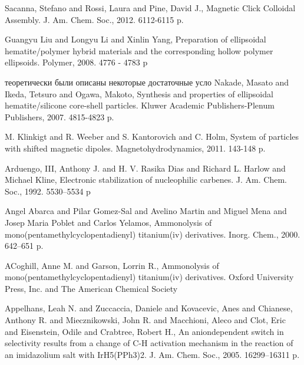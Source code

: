\documentclass[a4paper,14pt]{extarticle}
\begin{document}
    \begingroup
    \renewcommand{\section}[2]{}%
    \begin{thebibliography}{99}

        Sacanna, Stefano and Rossi, Laura and Pine, David J., Magnetic Click Colloidal Assembly. J. Am. Chem. Soc., 2012. 6112-6115 p.

        Guangyu Liu and Longyu Li and Xinlin Yang, Preparation of ellipsoidal hematite/polymer hybrid materials and the corresponding hollow polymer ellipsoids. Polymer, 2008. 4776 - 4783 p

        теоретически были описаны некоторые достаточные усло
        Nakade, Masato and Ikeda, Tetsuro and Ogawa, Makoto, Synthesis and properties of ellipsoidal hematite/silicone core-shell particles. Kluwer Academic Publishers-Plenum Publishers, 2007. 4815-4823 p.

        M. Klinkigt and R. Weeber and S. Kantorovich and C. Holm, System of particles with shifted magnetic dipoles. Magnetohydrodynamics, 2011. 143-148 p.

        Arduengo, III, Anthony J. and H. V. Rasika Dias and Richard L. Harlow and Michael Kline, Electronic stabilization of nucleophilic carbenes. J. Am. Chem. Soc., 1992. 5530–5534 p

        Angel Abarca and Pilar Gomez-Sal and Avelino Martin and Miguel Mena and Josep Maria Poblet and Carlos Yelamos, Ammonolysis of mono(pentamethylcyclopentadienyl) titanium(iv) derivatives. Inorg. Chem., 2000. 642–651 p.

        ACoghill, Anne M. and Garson, Lorrin R., Ammonolysis of mono(pentamethylcyclopentadienyl) titanium(iv) derivatives. Oxford University Press, Inc. and The American Chemical Society

        Appelhans, Leah N. and Zuccaccia, Daniele and Kovacevic, Anes and Chianese, Anthony R. and Miecznikowski, John R. and Macchioni, Aleco and Clot, Eric and Eisenstein, Odile and Crabtree, Robert H., An aniondependent switch in selectivity results from a change of C-H activation mechanism in the reaction of an imidazolium salt with IrH5(PPh3)2. J. Am. Chem. Soc., 2005. 16299–16311 p.


\end{thebibliography}
\end{document}
